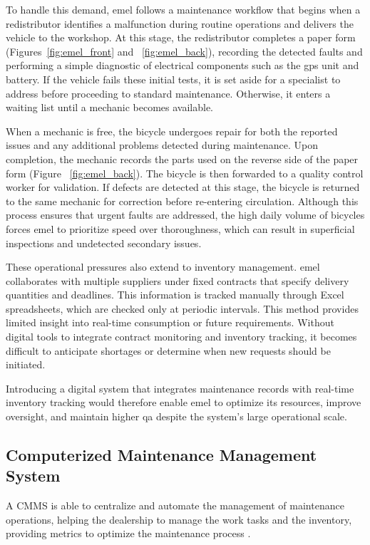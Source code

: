 To handle this demand, \acs{emel} follows a maintenance workflow that begins when a redistributor identifies a malfunction during routine operations and delivers the vehicle to the workshop. At this stage, the redistributor completes a paper form (Figures~\ref{fig:emel_front} and ~\ref{fig:emel_back}), recording the detected faults and performing a simple diagnostic of electrical components such as the \acs{gps} unit and battery. If the vehicle fails these initial tests, it is set aside for a specialist to address before proceeding to standard maintenance. Otherwise, it enters a waiting list until a mechanic becomes available.

When a mechanic is free, the bicycle undergoes repair for both the reported issues and any additional problems detected during maintenance. Upon completion, the mechanic records the parts used on the reverse side of the paper form (Figure ~\ref{fig:emel_back}). The bicycle is then forwarded to a quality control worker for validation. If defects are detected at this stage, the bicycle is returned to the same mechanic for correction before re-entering circulation. Although this process ensures that urgent faults are addressed, the high daily volume of bicycles forces \acs{emel} to prioritize speed over thoroughness, which can result in superficial inspections and undetected secondary issues.

These operational pressures also extend to inventory management. \acs{emel} collaborates with multiple suppliers under fixed contracts that specify delivery quantities and deadlines. This information is tracked manually through Excel spreadsheets, which are checked only at periodic intervals. This method provides limited insight into real-time consumption or future requirements. Without digital tools to integrate contract monitoring and inventory tracking, it becomes difficult to anticipate shortages or determine when new requests should be initiated.

Introducing a digital system that integrates maintenance records with real-time inventory tracking would therefore enable \acs{emel} to optimize its resources, improve oversight, and maintain higher \acs{qa} despite the system's large operational scale.


\subsection{Computerized Maintenance Management System}

A \ac{CMMS} is able to centralize and automate the management of maintenance operations, helping the dealership to manage the work tasks and the inventory, providing metrics to optimize the maintenance process \cite{CMMS_2020, Ibm_2025a, Besiktepe_2020}.

